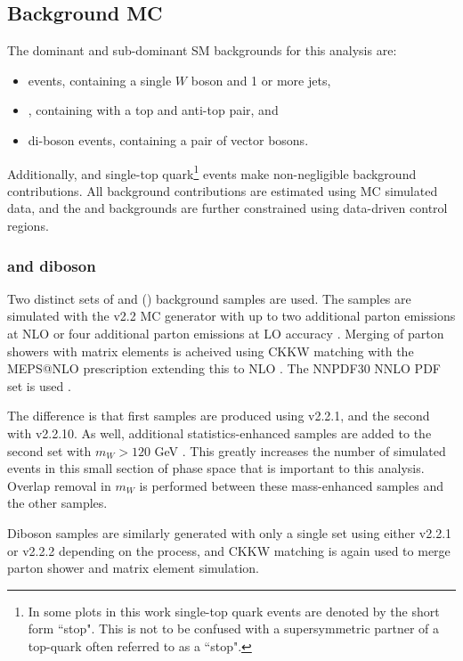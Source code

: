 \subsection{Background MC}
\label{subsection:mc_bkg}
The dominant and sub-dominant SM backgrounds for this analysis are:
\begin{itemize}
    \item \wjets events, containing a single $W$ boson and 1 or more jets,
    \item \ttbar, containing with a top and anti-top pair, and
    \item di-boson events, containing a pair of vector bosons.
\end{itemize}
Additionally, \zjets and single-top quark\footnote{In some plots in this work single-top quark events are denoted by the short form ``stop". This is not to be confused with a supersymmetric partner of a top-quark often referred to as a ``stop".} events make non-negligible background contributions. All background contributions are estimated using MC simulated data, and the \wjets and \ttbar backgrounds are further constrained using data-driven control regions.

\subsubsection{\vjets and diboson}
Two distinct sets of \wjets and \zjets (\vjets) background samples are used. The samples are simulated with the \sherpa v2.2 MC generator \cite{Sherpa} with up to two additional parton emissions at NLO or four additional parton emissions at LO accuracy \cite{VJets}\cite{VJets_mW}. Merging of parton showers with matrix elements is acheived using CKKW \cite{CKKW} matching with the MEPS@NLO prescription extending this to NLO \cite{MEPS}. The NNPDF30 NNLO PDF set is used \cite{PDF30}.

The difference is that first samples are produced using \sherpa v2.2.1, and the second with \sherpa v2.2.10. As well, additional statistics-enhanced \wjets samples are added to the second set with $m_W > 120$ GeV \cite{VJets_mW}. This greatly increases the number of simulated events in this small section of phase space that is important to this analysis. Overlap removal in $m_W$ is performed between these mass-enhanced samples and the other \wjets samples.

Diboson samples are similarly generated with only a single set using either \sherpa v2.2.1 or v2.2.2 depending on the process, and CKKW matching is again used to merge parton shower and matrix element simulation.

